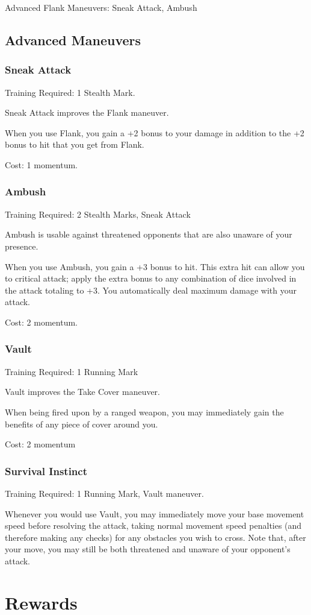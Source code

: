 \documentclass{article}
\begin{document}
Advanced Flank Maneuvers: Sneak Attack, Ambush
\subsection{Advanced Maneuvers}
\subsubsection{Sneak Attack}
Training Required: 1 Stealth Mark.

Sneak Attack improves the Flank maneuver.

When you use Flank, you gain a +2 bonus to your damage in addition to the +2 bonus to hit that you get from Flank.

Cost: 1 momentum.
\subsubsection{Ambush}
Training Required: 2 Stealth Marks, Sneak Attack

Ambush is usable against threatened opponents that are also unaware of your presence.

When you use Ambush, you gain a +3 bonus to hit. This extra hit can allow you to critical attack; apply the extra bonus to any combination of dice involved in the attack totaling to +3. You automatically deal maximum damage with your attack.

Cost: 2 momentum.
\subsubsection{Vault}
Training Required: 1 Running Mark

Vault improves the Take Cover maneuver.

When being fired upon by a ranged weapon, you may immediately gain the benefits of any piece of cover around you.

Cost: 2 momentum
\subsubsection{Survival Instinct}
Training Required: 1 Running Mark, Vault maneuver.

Whenever you would use Vault, you may immediately move your base movement speed before resolving the attack, taking normal movement speed penalties (and therefore making any checks) for any obstacles you wish to cross. Note that, after your move, you may still be both threatened and unaware of your opponent’s attack.
\section{Rewards}
\end{document}
